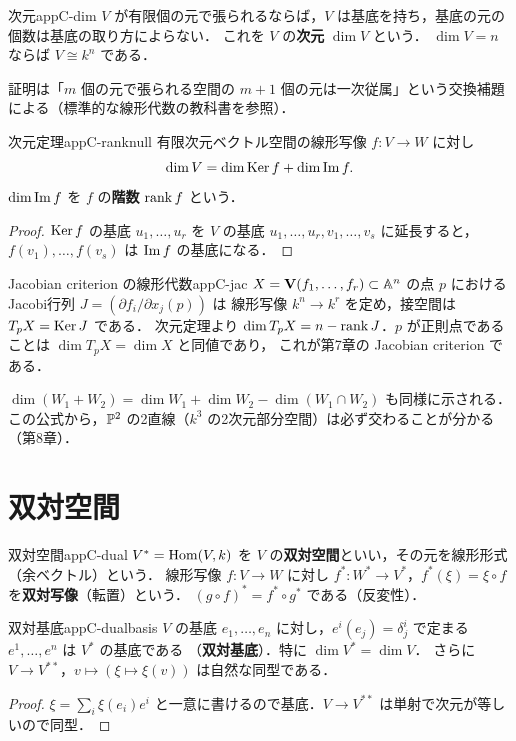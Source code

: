 \begin{mythm}{次元}{appC-dim}
$V$ が有限個の元で張られるならば，$V$ は基底を持ち，基底の元の個数は基底の取り方によらない．
これを $V$ の\textbf{次元} $\dim V$ という．
$\dim V=n$ ならば $V\cong k^n$ である．
\end{mythm}

証明は「$m$ 個の元で張られる空間の $m+1$ 個の元は一次従属」という交換補題による（標準的な線形代数の教科書を参照）．

\begin{mythm}{次元定理}{appC-ranknull}
有限次元ベクトル空間の線形写像 $f\colon V\to W$ に対し
\[
\dim V=\dim\operatorname{Ker} f+\dim\operatorname{Im} f .
\]
$\dim\operatorname{Im} f$ を $f$ の\textbf{階数} $\operatorname{rank} f$ という．
\end{mythm}
\begin{proof}
$\operatorname{Ker} f$ の基底 $u_1,\dots,u_r$ を $V$ の基底 $u_1,\dots,u_r,v_1,\dots,v_s$ に延長すると，
$f(v_1),\dots,f(v_s)$ は $\operatorname{Im} f$ の基底になる．
\end{proof}

\begin{myex}{Jacobian criterion の線形代数}{appC-jac}
$X=\mathbf{V}(f_1,\dots,f_r)\subset\mathbb{A}^n$ の点 $p$ におけるJacobi行列 $J=(\partial f_i/\partial x_j(p))$ は
線形写像 $k^n\to k^r$ を定め，接空間は $T_pX=\operatorname{Ker} J$ である．
次元定理より $\dim T_pX=n-\operatorname{rank} J$．$p$ が正則点であることは $\dim T_pX=\dim X$ と同値であり，
これが第7章の Jacobian criterion である．
\end{myex}

$\dim(W_1+W_2)=\dim W_1+\dim W_2-\dim(W_1\cap W_2)$ も同様に示される．
この公式から，$\mathbb{P}^2$ の2直線（$k^3$ の2次元部分空間）は必ず交わることが分かる（第8章）．

\section{双対空間}

\begin{mydef}{双対空間}{appC-dual}
$V^*=\operatorname{Hom}(V,k)$ を $V$ の\textbf{双対空間}といい，その元を線形形式（余ベクトル）という．
線形写像 $f\colon V\to W$ に対し $f^*\colon W^*\to V^*$，$f^*(\xi)=\xi\circ f$ を\textbf{双対写像}（転置）という．
$(g\circ f)^*=f^*\circ g^*$ である（反変性）．
\end{mydef}

\begin{myprop}{双対基底}{appC-dualbasis}
$V$ の基底 $e_1,\dots,e_n$ に対し，$e^i(e_j)=\delta^i_j$ で定まる $e^1,\dots,e^n$ は $V^*$ の基底である
（\textbf{双対基底}）．特に $\dim V^*=\dim V$．
さらに $V\to V^{**}$，$v\mapsto(\xi\mapsto\xi(v))$ は自然な同型である．
\end{myprop}
\begin{proof}
$\xi=\sum_i\xi(e_i)e^i$ と一意に書けるので基底．$V\to V^{**}$ は単射で次元が等しいので同型．
\end{proof}

